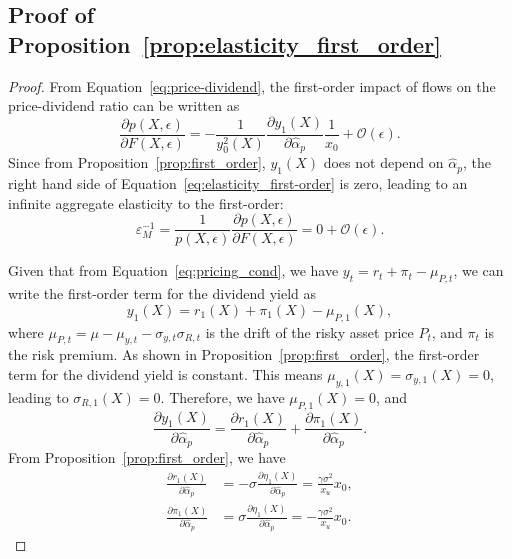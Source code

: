 \subsection{Proof of Proposition~\ref{prop:elasticity_first_order}}\label{app:prop_first_order_elasticity}
\begin{proof}
	From Equation~\eqref{eq:price-dividend}, the first-order impact of flows on the price-dividend ratio can be written as
	\begin{equation}\label{eq:elasticity_first-order}
	\frac{\partial p(X,\epsilon)}{\partial F(X,\epsilon)} =-\frac{1}{y_0^2(X)}\frac{\partial y_1(X)}{\partial\hat{\alpha}_p}\frac{1}{x_0} 
	+ \mathcal{O}(\epsilon).
	\end{equation}
	Since from Proposition~\ref{prop:first_order}, $ y_1(X) $ does not depend on $ \hat{\alpha}_p $, the right hand side of Equation~\eqref{eq:elasticity_first-order} is zero, leading to an infinite aggregate elasticity to the first-order:
	\[\varepsilon_M^{-1}=\frac{1}{p(X,\epsilon)}\frac{\partial p(X,\epsilon)}{\partial F(X,\epsilon)}=0+ \mathcal{O}(\epsilon).\]
	
	Given that from Equation~\eqref{eq:pricing_cond}, we have $ y_t=r_t+\pi_t-\mu_{P,t} $, we can write the first-order term for the dividend yield as
	\[y_1(X)=r_1(X)+\pi_1(X)-\mu_{P,1}(X),\]
	where $ \mu_{P,t}=\mu-\mu_{y,t}-\sigma_{y,t}\sigma_{R,t} $ is the drift of the risky asset price $ P_t $, and $ \pi_t $ is the risk premium.
	As shown in Proposition~\ref{prop:first_order}, the first-order term for the dividend yield is constant. This means $ \mu_{y,1}(X)=\sigma_{y,1}(X)=0 $, leading to $ \sigma_{R,1}(X)=0 $. Therefore, we have $ \mu_{P,1}(X)=0 $, and
	\[\frac{\partial y_1(X)}{\partial\hat{\alpha}_p}=\frac{\partial r_1(X)}{\partial\hat{\alpha}_p}+\frac{\partial \pi_1(X)}{\partial\hat{\alpha}_p}.\]
	From Proposition~\ref{prop:first_order}, we have
	\begin{align*}
		\frac{\partial r_1(X)}{\partial\hat{\alpha}_p}&=-\sigma\frac{\partial \eta_1(X)}{\partial\hat{\alpha}_p}=\frac{\gamma\sigma^2}{x_u}x_0,\\
		\frac{\partial \pi_1(X)}{\partial\hat{\alpha}_p}&=\sigma\frac{\partial \eta_1(X)}{\partial\hat{\alpha}_p}=-\frac{\gamma\sigma^2}{x_u}x_0.
	\end{align*}
	

\end{proof}
